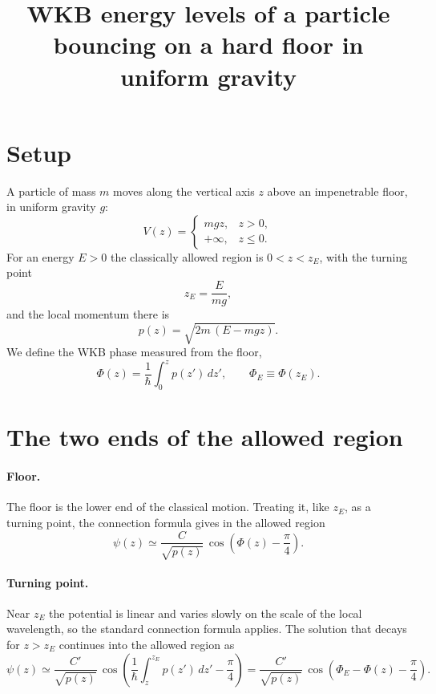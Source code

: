 \documentclass{article}
\title{WKB energy levels of a particle bouncing on a hard floor in uniform gravity}
\date{}
\begin{document}
\maketitle

\section{Setup}
A particle of mass $m$ moves along the vertical axis $z$ above an impenetrable floor, in uniform gravity $g$:
\begin{equation}
  V(z) = \begin{cases} mgz, & z > 0, \\ +\infty, & z \le 0 . \end{cases}
  \label{eq:potential}
\end{equation}
For an energy $E > 0$ the classically allowed region is $0 < z < z_E$, with the turning point
\begin{equation}
  z_E = \frac{E}{mg} ,
  \label{eq:turning}
\end{equation}
and the local momentum there is
\begin{equation}
  p(z) = \sqrt{2m\,(E - mgz)} .
  \label{eq:momentum}
\end{equation}
We define the WKB phase measured from the floor,
\begin{equation}
  \Phi(z) = \frac{1}{\hbar}\int_0^z p(z')\,dz', \qquad \Phi_E \equiv \Phi(z_E) .
  \label{eq:phase}
\end{equation}

\section{The two ends of the allowed region}
\paragraph{Floor.} The floor is the lower end of the classical motion. Treating it, like $z_E$, as a turning point, the connection formula gives in the allowed region
\begin{equation}
  \psi(z) \simeq \frac{C}{\sqrt{p(z)}}\,\cos\!\left(\Phi(z) - \frac{\pi}{4}\right) .
  \label{eq:floor}
\end{equation}

\paragraph{Turning point.} Near $z_E$ the potential is linear and varies slowly on the scale of the local wavelength, so the standard connection formula applies. The solution that decays for $z > z_E$ continues into the allowed region as
\begin{equation}
  \psi(z) \simeq \frac{C'}{\sqrt{p(z)}}\,\cos\!\left(\frac{1}{\hbar}\int_z^{z_E} p(z')\,dz' - \frac{\pi}{4}\right) = \frac{C'}{\sqrt{p(z)}}\,\cos\!\left(\Phi_E - \Phi(z) - \frac{\pi}{4}\right) .
  \label{eq:connection}
\end{equation}
\end{document}
